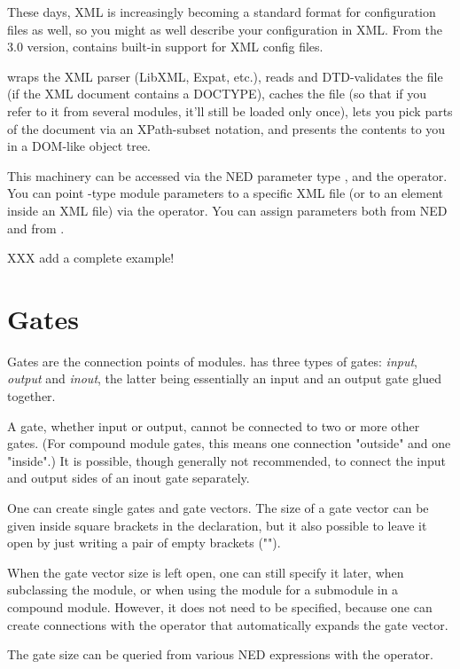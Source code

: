 These days, XML is increasingly becoming a standard format for configuration
files as well, so you might as well describe your configuration in XML.
From the 3.0 version, {\opp} contains built-in support for XML config files.

{\opp} wraps the XML parser (LibXML, Expat, etc.), reads and DTD-validates
the file (if the XML document contains a DOCTYPE), caches the file
(so that if you refer to it from several modules, it'll still be loaded
only once), lets you pick parts of the document via an XPath-subset notation,
and presents the contents to you in a DOM-like object tree.

This machinery can be accessed via the NED parameter type , and the
 operator. You can point -type module parameters
to a specific XML file (or to an element inside an XML file) via the
 operator. You can assign  parameters both from NED
and from .

XXX add a complete example!


\section{Gates}

Gates are the connection points of modules.  {\opp} has three types of
gates: \textit{input}, \textit{output} and \textit{inout}, the latter being
essentially an input and an output gate glued together.

A gate, whether input or output, cannot be connected to two or more other
gates. (For compound module gates, this means one connection "outside" and
one "inside".)  It is possible, though generally not recommended, to
connect the input and output sides of an inout gate separately.

One can create single gates and gate vectors. The size of a gate vector
can be given inside square brackets in the declaration, but it also possible
to leave it open by just writing a pair of empty brackets ("\ttt{[]}").

When the gate vector size is left open, one can still specify it later,
when subclassing the module, or when using the module for a submodule in a
compound module. However, it does not need to be specified, because
one can create connections with the  operator that
automatically expands the gate vector.

The gate size can be queried from various NED expressions with the
 operator.


